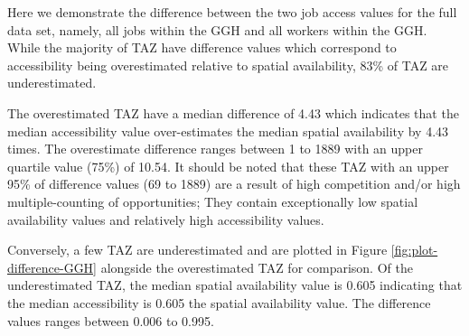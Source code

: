 \documentclass[]{elsarticle} %
\begin{document}
Here we demonstrate the difference between the two job access values for
the full data set, namely, all jobs within the GGH and all workers
within the GGH. While the majority of TAZ have difference values which
correspond to accessibility being overestimated relative to spatial
availability, 83\% of TAZ are underestimated.

The overestimated TAZ have a median difference of 4.43 which indicates
that the median accessibility value over-estimates the median spatial
availability by 4.43 times. The overestimate difference ranges between 1
to 1889 with an upper quartile value (75\%) of 10.54. It should be noted
that these TAZ with an upper 95\% of difference values (69 to 1889) are
a result of high competition and/or high multiple-counting of
opportunities; They contain exceptionally low spatial availability
values and relatively high accessibility values.

Conversely, a few TAZ are underestimated and are plotted in Figure
\ref{fig:plot-difference-GGH} alongside the overestimated TAZ for
comparison. Of the underestimated TAZ, the median spatial availability
value is 0.605 indicating that the median accessibility is 0.605 the
spatial availability value. The difference values ranges between 0.006
to 0.995.
\end{document}
